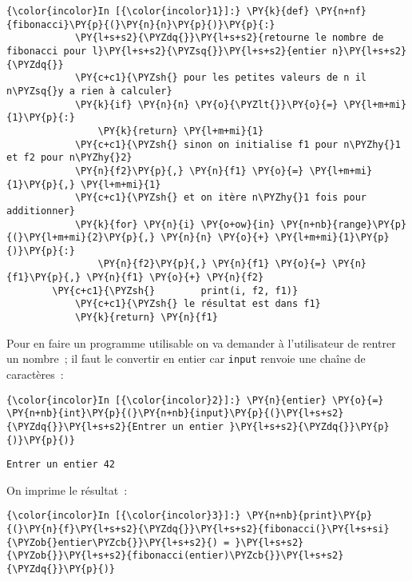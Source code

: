     \begin{Verbatim}[commandchars=\\\{\}]
{\color{incolor}In [{\color{incolor}1}]:} \PY{k}{def} \PY{n+nf}{fibonacci}\PY{p}{(}\PY{n}{n}\PY{p}{)}\PY{p}{:}
            \PY{l+s+s2}{\PYZdq{}}\PY{l+s+s2}{retourne le nombre de fibonacci pour l}\PY{l+s+s2}{\PYZsq{}}\PY{l+s+s2}{entier n}\PY{l+s+s2}{\PYZdq{}}
            \PY{c+c1}{\PYZsh{} pour les petites valeurs de n il n\PYZsq{}y a rien à calculer}
            \PY{k}{if} \PY{n}{n} \PY{o}{\PYZlt{}}\PY{o}{=} \PY{l+m+mi}{1}\PY{p}{:}
                \PY{k}{return} \PY{l+m+mi}{1}
            \PY{c+c1}{\PYZsh{} sinon on initialise f1 pour n\PYZhy{}1 et f2 pour n\PYZhy{}2}
            \PY{n}{f2}\PY{p}{,} \PY{n}{f1} \PY{o}{=} \PY{l+m+mi}{1}\PY{p}{,} \PY{l+m+mi}{1}
            \PY{c+c1}{\PYZsh{} et on itère n\PYZhy{}1 fois pour additionner}
            \PY{k}{for} \PY{n}{i} \PY{o+ow}{in} \PY{n+nb}{range}\PY{p}{(}\PY{l+m+mi}{2}\PY{p}{,} \PY{n}{n} \PY{o}{+} \PY{l+m+mi}{1}\PY{p}{)}\PY{p}{:}
                \PY{n}{f2}\PY{p}{,} \PY{n}{f1} \PY{o}{=} \PY{n}{f1}\PY{p}{,} \PY{n}{f1} \PY{o}{+} \PY{n}{f2}
        \PY{c+c1}{\PYZsh{}        print(i, f2, f1)}
            \PY{c+c1}{\PYZsh{} le résultat est dans f1}
            \PY{k}{return} \PY{n}{f1}
\end{Verbatim}


    Pour en faire un programme utilisable on va demander à l'utilisateur de
rentrer un nombre~; il faut le convertir en entier car \texttt{input}
renvoie une chaîne de caractères~:

    \begin{Verbatim}[commandchars=\\\{\}]
{\color{incolor}In [{\color{incolor}2}]:} \PY{n}{entier} \PY{o}{=} \PY{n+nb}{int}\PY{p}{(}\PY{n+nb}{input}\PY{p}{(}\PY{l+s+s2}{\PYZdq{}}\PY{l+s+s2}{Entrer un entier }\PY{l+s+s2}{\PYZdq{}}\PY{p}{)}\PY{p}{)}
\end{Verbatim}


    \begin{Verbatim}[commandchars=\\\{\}]
Entrer un entier 42

    \end{Verbatim}

    On imprime le résultat~:

    \begin{Verbatim}[commandchars=\\\{\}]
{\color{incolor}In [{\color{incolor}3}]:} \PY{n+nb}{print}\PY{p}{(}\PY{n}{f}\PY{l+s+s2}{\PYZdq{}}\PY{l+s+s2}{fibonacci(}\PY{l+s+si}{\PYZob{}entier\PYZcb{}}\PY{l+s+s2}{) = }\PY{l+s+s2}{\PYZob{}}\PY{l+s+s2}{fibonacci(entier)\PYZcb{}}\PY{l+s+s2}{\PYZdq{}}\PY{p}{)}
\end{Verbatim}


